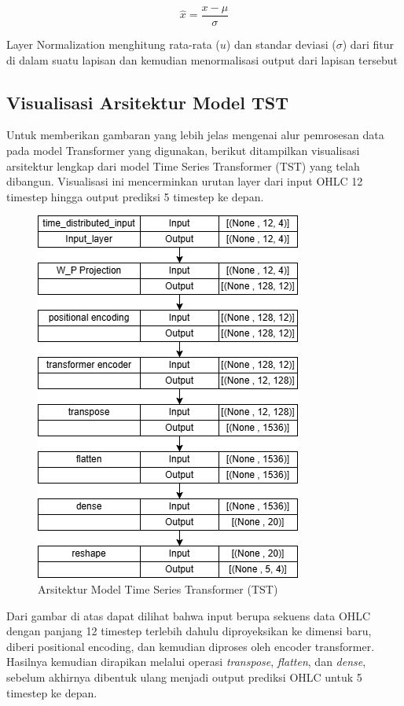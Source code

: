 \begin{equation}
    \hat{x} = \frac{x - \mu}{\sigma}
\end{equation}

Layer Normalization menghitung rata-rata (\( u \)) dan standar deviasi ($\sigma$) dari fitur di dalam suatu lapisan dan kemudian menormalisasi output dari lapisan tersebut

\newpage
\subsection{Visualisasi Arsitektur Model TST}
Untuk memberikan gambaran yang lebih jelas mengenai alur pemrosesan data pada model Transformer yang digunakan, berikut ditampilkan visualisasi arsitektur lengkap dari model Time Series Transformer (TST) yang telah dibangun. Visualisasi ini mencerminkan urutan layer dari input OHLC 12 timestep hingga output prediksi 5 timestep ke depan.

\begin{figure}[H]
    \centering
    \includegraphics[scale=0.65]{gambar/tstars.png} 
    \caption{Arsitektur Model Time Series Transformer (TST)}
    \label{fig:tst_architecture}
\end{figure}

Dari gambar di atas dapat dilihat bahwa input berupa sekuens data OHLC dengan panjang 12 timestep terlebih dahulu diproyeksikan ke dimensi baru, diberi positional encoding, dan kemudian diproses oleh encoder transformer. Hasilnya kemudian dirapikan melalui operasi \textit{transpose}, \textit{flatten}, dan \textit{dense}, sebelum akhirnya dibentuk ulang menjadi output prediksi OHLC untuk 5 timestep ke depan.


